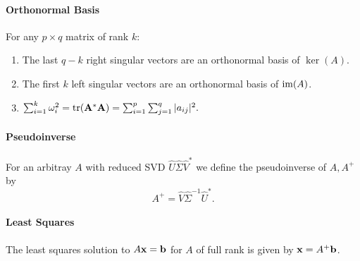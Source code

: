 \paragraph{Orthonormal Basis}
For any \(p \times q\) matrix of rank \(k\):
\begin{enumerate}[label = \alph*)]
    \item The last \(q -k\) right singular vectors are an orthonormal basis of \(\ker(A)\).
    \item The first \(k\) left singular vectors are an orthonormal basis of \(\operatorname{im}(A)\).
    \item \(\sum_{i=1}^k \omega_i^2 = \tr(\mathbf{A}^*\mathbf{A}) = \sum_{i=1}^p\sum_{j=1}^q |a_{ij}|^2.\)
\end{enumerate}

\paragraph{Pseudoinverse}
For an arbitray \(A\) with reduced SVD \(\hat{U}\hat{\Sigma}\hat{V}^*\) we define the pseudoinverse of \(A, A^+\) by
\[A^+ = \hat{V}\hat{\Sigma}^{-1}\hat{U}^*.\]

\paragraph{Least Squares}
The least squares solution to \(A\mathbf{x} = \mathbf{b}\) for \(A\) of full rank is given by \(\mathbf{x} = A^+\mathbf{b}\).